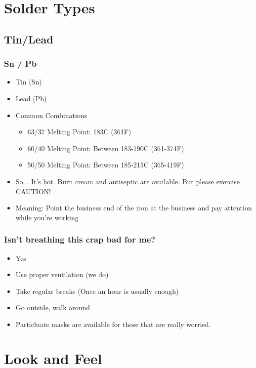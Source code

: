 \documentclass{beamer}
\begin{document}
\section{Solder Types}
\subsection{Tin/Lead}
\begin{frame}
  \frametitle{Sn / Pb}
  \begin{itemize}
  \item Tin (Sn)
  \item Lead (Pb)
  \item Common Combinations
    \begin{itemize}
    \item 63/37 Melting Point: 183\textdegree C (361\textdegree F)
    \item 60/40 Melting Point: Between 183-190\textdegree C (361-374\textdegree F)
    \item 50/50 Melting Point: Between 185-215\textdegree C (365-419\textdegree F)
    \end{itemize}
  \item So... It's hot. Burn cream and antiseptic are available. But please exercise CAUTION!
  \item Meaning: Point the business end of the iron at the business
    and pay attention while you're working
  \end{itemize}
\end{frame}

\begin{frame}
  \frametitle{Isn't breathing this crap bad for me?}
  \begin{itemize}
    \item Yes
    \item Use proper ventilation (we do)
    \item Take regular breaks (Once an hour is usually enough)
    \item Go outside, walk around
    \item Particluate masks are available for those that are really worried.
  \end{itemize}
\end{frame}

\section{Look and Feel}
\end{document}
